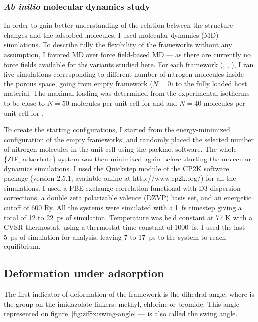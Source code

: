 \documentclass[thesis]{subfiles}
\begin{document}
\subsubsection{\emph{Ab initio} molecular dynamics study}
\label{sec:zif8x:methods}

In order to gain better understanding of the relation between the structure
changes and the adsorbed molecules, I used molecular dynamics (MD) simulations.
To describe fully the flexibility of the frameworks without any assumption, I
favored \abinitio MD over force field-based MD --- as there are currently no
force fields available for the  variants studied here. For each framework
(, \ZIFCl, \ZIFBr), I ran five simulations corresponding to different
number of nitrogen molecules inside the porous space, going from empty framework
($N = 0$) to the fully loaded host material. The maximal loading was determined
from the experimental isotherms to be close to $N = 50$ molecules per unit cell
for  and \ZIFCl and $N = 40$ molecules per unit cell for \ZIFBr.

To create the starting configurations, I started from the energy-minimized
configuration of the empty frameworks, and randomly placed the selected number
of nitrogen molecules in the unit cell using the packmol
software\cite{Martnez2009}. The whole \{ZIF, adsorbate\} system was then
minimized again before starting the molecular dynamics simulations. I used the
Quickstep module\cite{VandeVondele2005} of the CP2K software package (version
2.5.1, available online at http://www.cp2k.org/) for all the simulations. I used
a PBE exchange-correlation functional with D3 dispersion corrections, a double
zeta polarizable valence (DZVP) basis set, and an energetic cutoff of 600 Ry.
All the systems were simulated with a \SI{1}{fs} timestep giving a total of 12
to \SI{22}{ps} of simulation. Temperature was held constant at 77 K with a CVSR
thermostat, using a thermostat time constant of \SI{1000}{fs}. I used the last
\SI{5}{ps} of simulation for analysis, leaving 7 to \SI{17}{ps} to the system to
reach equilibrium.

\subsection{Deformation under adsorption}
\label{sec:zif8x:swing}

The first indicator of deformation of the framework is the 
dihedral angle, where  is the group on the imidazolate linkers: methyl,
chlorine or bromide. This angle --- represented on
figure~\ref{fig:zif8x:swing-angle} --- is also called the swing angle.
\end{document}
